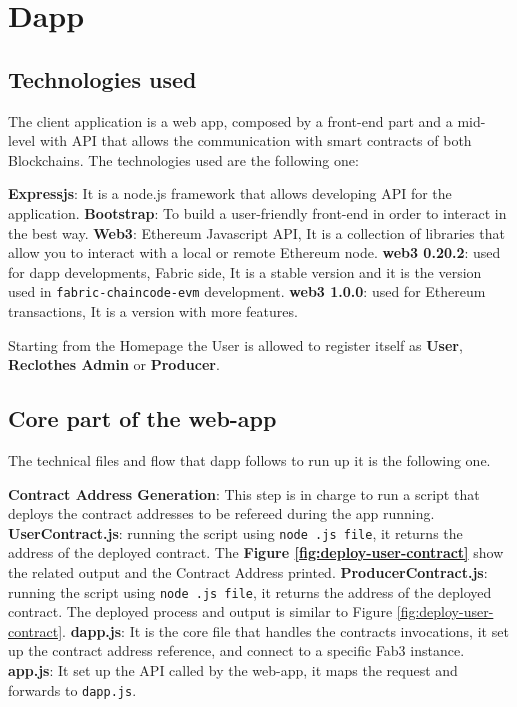 \newpage
\section{Dapp}

\subsection{Technologies used}

The client application is a web app, composed by a front-end part and a mid-level with API that allows
the communication with smart contracts of both Blockchains. The technologies used are the following one:

\begin{outline}
    \1 \textbf{Expressjs}: It is a node.js framework that allows developing API for the application.
    \1 \textbf{Bootstrap}: To build a user-friendly front-end in order to interact in the best way.
    \1 \textbf{Web3}: Ethereum Javascript API, It is a collection of libraries that allow you to interact with a 
    local or remote Ethereum node. 
    \2 \textbf{web3 0.20.2}: used for dapp developments, Fabric side, It is a stable version and it is the version
    used in \texttt{fabric-chaincode-evm} development.
    \2 \textbf{web3 1.0.0}: used for Ethereum transactions, It is a version with more features.
\end{outline}

Starting from the Homepage the User is allowed to register itself as \textbf{User}, \textbf{Reclothes Admin}
or \textbf{Producer}.

\subsection{Core part of the web-app}

The technical files and flow that dapp follows to run up it is the following one.

\begin{outline}[enumerate]
    \1 \textbf{Contract Address Generation}:
    \2 This step is in charge to run a script that deploys the contract addresses to be refereed during the 
    app running.
    \3 \textbf{UserContract.js}: running the script using \texttt{node .js file}, it returns the address of the 
    deployed contract. The \textbf{Figure \ref{fig:deploy-user-contract}} show the related output and the Contract 
    Address printed. 
    \3 \textbf{ProducerContract.js}: running the script using \texttt{node .js file}, it returns the address of 
    the deployed contract. The deployed process and output is similar to Figure \ref{fig:deploy-user-contract}.
    \1  \textbf{dapp.js}: It is the core file that handles the contracts invocations, it set up the contract address 
    reference, and connect to a specific Fab3 instance.
    \1 \textbf{app.js}: It set up the API called by the web-app, it maps the request and forwards to \texttt{dapp.js}.
\end{outline}

